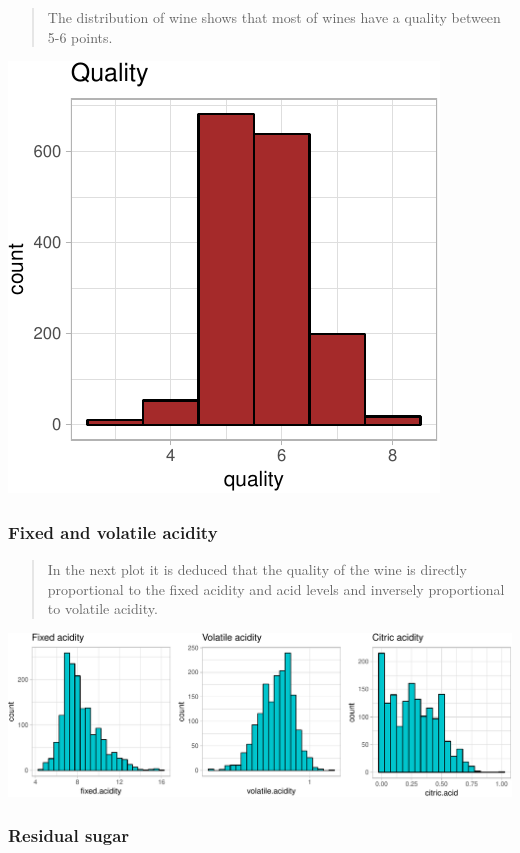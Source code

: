 \documentclass[]{article}
\begin{document}
\begin{quote}
The distribution of wine shows that most of wines have a quality between
5-6 points.
\end{quote}

\includegraphics{Figs/Univariate_Plots-1.pdf}

\subsubsection{Fixed and volatile
acidity}\label{fixed-and-volatile-acidity}

\begin{quote}
In the next plot it is deduced that the quality of the wine is directly
proportional to the fixed acidity and acid levels and inversely
proportional to volatile acidity.
\end{quote}

\includegraphics{Figs/Univariate_Plots_acidity-1.pdf}

\subsubsection{Residual sugar}\label{residual-sugar}
\end{document}
